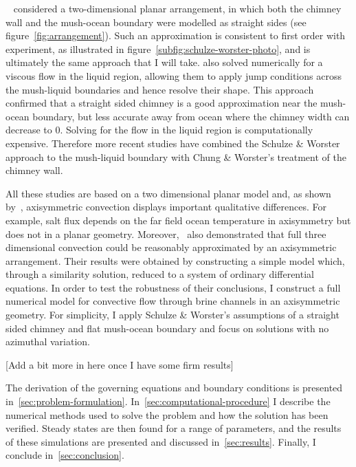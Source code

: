 \documentclass[11pt]{proc}
\begin{document}
~\citet*{schulze-worster-98} considered a two-dimensional planar arrangement, in which both the chimney wall and the mush-ocean boundary were modelled as straight sides (see figure~\ref{fig:arrangement}). Such an approximation is consistent to first order with experiment, as illustrated in figure~\ref{subfig:schulze-worster-photo}, and is ultimately the same approach that I will take.
\citet*{chung-worster-02} also solved numerically for a viscous flow in the liquid region, allowing them to apply jump conditions across the mush-liquid boundaries and hence resolve their shape. This approach confirmed that a straight sided chimney is a good approximation near the mush-ocean boundary, but less accurate away from ocean where the chimney width can decrease to $0$. Solving for the flow in the liquid region is computationally expensive. Therefore more recent studies \citep*{wells-et-al-10, wells-et-al-13} have combined the Schulze \& Worster approach to the mush-liquid boundary with Chung \& Worster's treatment of the chimney wall. 

All these studies are based on a two dimensional planar model and, as shown by~\citet*{rees-jones-worster-13}, axisymmetric convection displays important qualitative differences. For example, salt flux depends on the far field ocean temperature in axisymmetry but does not in a planar geometry. Moreover,~\citet*{rees-jones-worster-13} also demonstrated that full three dimensional convection could be reasonably approximated by an axisymmetric arrangement. Their results were obtained by constructing a simple model which, through a similarity solution, reduced to a system of ordinary differential equations. In order to test the robustness of their conclusions, I construct a full numerical model for convective flow through brine channels in an axisymmetric geometry. For simplicity, I apply Schulze \& Worster's assumptions of a straight sided chimney and flat mush-ocean boundary and focus on solutions with no azimuthal variation.

[Add a bit more in here once I have some firm results]

The derivation of the governing equations and boundary conditions is presented in~\autoref{sec:problem-formulation}. In~\autoref{sec:computational-procedure} I describe the numerical methods used to solve the problem and how the solution has been verified. Steady states are then found for a range of parameters, and the results of these simulations are presented and discussed in~\autoref{sec:results}. Finally, I conclude in~\autoref{sec:conclusion}.
\end{document}
